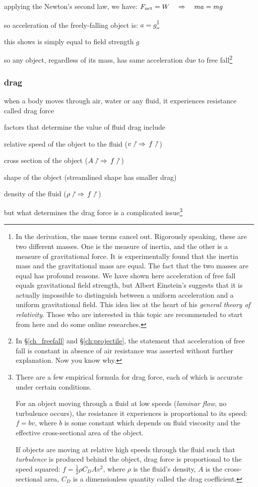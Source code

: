 applying the Newton's second law, we have: $F_\text{net} = W \quad \Rightarrow \quad ma = mg$

so acceleration of the freely-falling object is: $\boxed{a=g}$\footnote{In the derivation, the mass terms cancel out. Rigorously speaking, these are two different masses. One is the measure of inertia, and the other is a measure of gravitational force. It is experimentally found that the inertia mass and the gravitational mass are equal. The fact that the two masses are equal has profound reasons. We have shown here acceleration of free fall equals gravitational field strength, but Albert Einstein’s suggests that it is actually impossible to distinguish between a uniform acceleration and a uniform gravitational field. This idea lies at the heart of his \emph{general theory of relativity}. Those who are interested in this topic are recommended to start from here and do some online researches.}

\cmt this shows  is simply equal to field strength $g$

so any object, regardless of its mass, has same acceleration due to free fall\footnote{In \S\ref{ch_freefall} and \S\ref{ch:projectile}, the statement that acceleration of free fall is constant in absence of air resistance was asserted without further explanation. Now you know why.}


\subsubsection{drag}

when a body moves through air, water or any fluid, it experiences resistance called drag force

\cmt factors that determine the value of fluid drag include

\titem relative speed of the object to the fluid ($v\nnearrow \, \Rightarrow \, f\nnearrow$)

\titem cross section of the object ($A\nnearrow \, \Rightarrow \, f\nnearrow$)

\titem shape of the object (streamlined shape has smaller drag)

\titem density of the fluid ($\rho\nnearrow \, \Rightarrow \, f\nnearrow$)

but what determines the drag force is a complicated issue\footnote{There are a few empirical formula for drag force, each of which is accurate under certain conditions.
	
	For an object moving through a fluid at low speeds (\emph{laminar flow}, no turbulence occurs), the resistance it experiences is proportional to its speed: $f=bv$, where $b$ is some constant which depends on fluid viscosity and the effective cross-sectional area of the object.
	
	If objects are moving at relative high speeds through the fluid such that \emph{turbulence} is produced behind the object, drag force is proportional to the speed squared: $ f = \frac{1}{2} \rho C_D A v^2$, where $\rho$ is the fluid's density, $A$ is the cross-sectional area, $C_D$ is a dimensionless quantity called the drag coefficient.}

